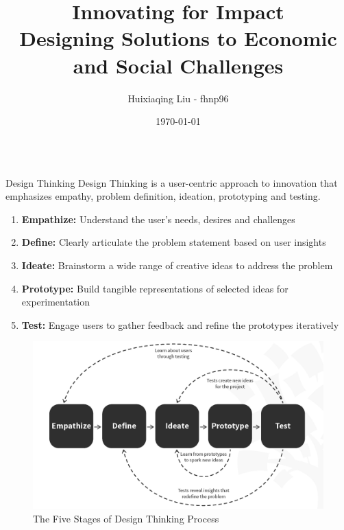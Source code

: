 \documentclass[final]{beamer}
\title{Innovating for Impact \\ Designing Solutions to Economic and Social Challenges}
\author{Huixiaqing Liu - fhnp96}
\date{\today}
\begin{document}
\begin{frame}{}
	\vspace{-1.4cm}


	\begin{columns}[t]

		\begin{column}{.3\linewidth}

			\begin{block}{Design Thinking}
				Design Thinking is a user-centric approach to innovation that emphasizes empathy, problem definition, ideation, prototyping and testing.

				\begin{enumerate}
					\item \textbf{Empathize:} Understand the user's needs, desires and challenges
					\item \textbf{Define:} Clearly articulate the problem statement based on user insights
					\item \textbf{Ideate:} Brainstorm a wide range of creative ideas to address the problem
					\item \textbf{Prototype:} Build tangible representations of selected ideas for experimentation
					\item \textbf{Test:} Engage users to gather feedback and refine the prototypes iteratively
				\end{enumerate}
				\vspace{0.67cm}
				\begin{figure}
					\includegraphics[width=\linewidth]{./images/design_thinking_process.png}
					\caption{The Five Stages of Design Thinking Process}
				\end{figure}


\end{block}
\end{column}
\end{columns}
\end{frame}
\end{document}
